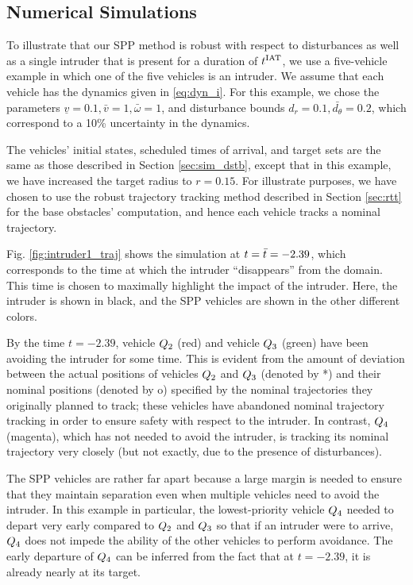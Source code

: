 \subsection{Numerical Simulations \label{sec:intruder_results}}
To illustrate that our SPP method is robust with respect to disturbances as well as a single intruder that is present for a duration of $t^\text{IAT}$, we use a five-vehicle example in which one of the five vehicles is an intruder. We assume that each vehicle has the dynamics given in \eqref{eq:dyn_i}. For this example, we chose the parameters $\underline{v} = 0.1, \bar{v} = 1, \bar\omega = 1$, and disturbance bounds $d_{r} = 0.1, \bar{d_{\theta}} = 0.2$, which correspond to a 10\% uncertainty in the dynamics. 

The vehicles' initial states, scheduled times of arrival, and target sets are the same as those described in Section \ref{sec:sim_dstb}, except that in this example, we have increased the target radius to $r=0.15$. For illustrate purposes, we have chosen to use the robust trajectory tracking method described in Section \ref{sec:rtt} for the base obstacles' computation, and hence each vehicle tracks a nominal trajectory.

Fig. \ref{fig:intruder1_traj} shows the simulation at $t = \bar{t} = -2.39$, which corresponds to the time at which the intruder ``disappears'' from the domain. This time is chosen to maximally highlight the impact of the intruder. Here, the intruder is shown in black, and the SPP vehicles are shown in the other different colors.

By the time $t = -2.39$, vehicle $Q_2$ (red) and vehicle $Q_3$ (green) have been avoiding the intruder for some time. This is evident from the amount of deviation between the actual positions of vehicles $Q_2$ and $Q_3$ (denoted by *) and their nominal positions (denoted by o) specified by the nominal trajectories they originally planned to track; these vehicles have abandoned nominal trajectory tracking in order to ensure safety with respect to the intruder. In contrast, $Q_4$ (magenta), which has not needed to avoid the intruder, is tracking its nominal trajectory very closely (but not exactly, due to the presence of disturbances).

The SPP vehicles are rather far apart because a large margin is needed to ensure that they maintain separation even when multiple vehicles need to avoid the intruder. In this example in particular, the lowest-priority vehicle $Q_4$ needed to depart very early compared to $Q_2$ and $Q_3$ so that if an intruder were to arrive, $Q_4$ does not impede the ability of the other vehicles to perform avoidance. The early departure of $Q_4$ can be inferred from the fact that at $t=-2.39$, it is already nearly at its target.

